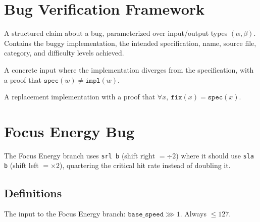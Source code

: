 \chapter{Bug Verification Framework}\label{ch:harness}

\begin{definition}\label{def:bug_claim}
  \leanok
  A structured claim about a bug, parameterized over input/output types $(\alpha, \beta)$.
  Contains the buggy implementation, the intended specification, name, source file, category, and difficulty levels achieved.
\end{definition}

\begin{definition}\label{def:bug_witness}
  \leanok
  A concrete input where the implementation diverges from the specification,
  with a proof that $\texttt{spec}(w) \neq \texttt{impl}(w)$.
\end{definition}

\begin{definition}\label{def:bug_fix}
  \leanok
  A replacement implementation with a proof that $\forall x,\ \texttt{fix}(x) = \texttt{spec}(x)$.
\end{definition}

\chapter{Focus Energy Bug}\label{ch:focus_energy}

The Focus Energy branch uses \texttt{srl b} (shift right $= \div 2$) where it should use
\texttt{sla b} (shift left $= \times 2$), quartering the critical hit rate instead of doubling it.

\section{Definitions}

\begin{definition}\label{def:crit_rate_input}
  \leanok
  The input to the Focus Energy branch: $\texttt{base\_speed} \ggg 1$. Always $\le 127$.
\end{definition}

